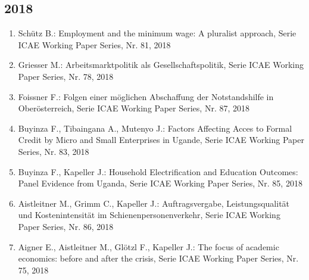 \subsection*{2018}
\begin{enumerate}
    	 \item Schütz B.: Employment and the minimum wage: A pluralist approach, Serie ICAE Working Paper Series, Nr. 81, 2018
	 \item Griesser M.: Arbeitsmarktpolitik als Gesellschaftspolitik, Serie ICAE Working Paper Series, Nr. 78, 2018
	 \item Foissner F.: Folgen einer möglichen Abschaffung der Notstandshilfe in Oberösterreich, Serie ICAE Working Paper Series, Nr. 87, 2018
	 \item Buyinza F., Tibaingana A., Mutenyo J.: Factors Affecting Acces to Formal Credit by Micro and Small Enterprises in Ugande, Serie ICAE Working Paper Series, Nr. 83, 2018
	 \item Buyinza F., Kapeller J.: Household Electrification and Education Outcomes: Panel Evidence from Uganda, Serie ICAE Working Paper Series, Nr. 85, 2018
	 \item Aistleitner M., Grimm C., Kapeller J.: Auftragsvergabe, Leistungsqualität und Kostenintensität im Schienenpersonenverkehr, Serie ICAE Working Paper Series, Nr. 86, 2018
	 \item Aigner E., Aistleitner M., Glötzl F., Kapeller J.: The focus of academic economics: before and after the crisis, Serie ICAE Working Paper Series, Nr. 75, 2018
\end{enumerate}
